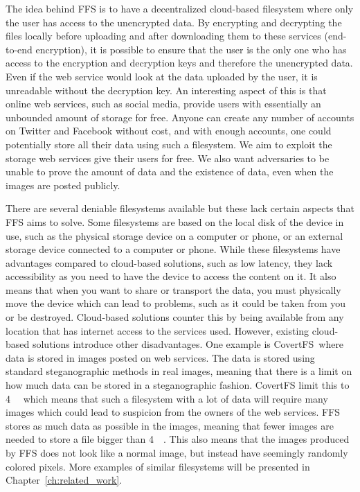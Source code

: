 The idea behind \gls{FFS} is to have a decentralized \mbox{cloud-based} filesystem where only the user has access to the unencrypted data. By encrypting and decrypting the files locally before uploading and after downloading them to these services (\mbox{end-to-end} encryption), it is possible to ensure that the user is the only one who has access to the encryption and decryption keys and therefore the unencrypted data. Even if the web service would look at the data uploaded by the user, it is unreadable without the decryption key. An interesting aspect of this is that online web services, such as social media, provide users with essentially an unbounded amount of storage for free. Anyone can create any number of accounts on Twitter and Facebook without cost, and with enough accounts, one could potentially store all their data using such a filesystem. We aim to exploit the storage web services give their users for free. We also want adversaries to be unable to prove the amount of data and the existence of data, even when the images are posted publicly.

There are several deniable filesystems available but these lack certain aspects that \gls{FFS} aims to solve. Some filesystems are based on the local disk of the device in use, such as the physical storage device on a computer or phone, or an external storage device connected to a computer or phone. While these filesystems have advantages compared to \mbox{cloud-based} solutions, such as low latency, they lack accessibility as you need to have the device to access the content on it. It also means that when you want to share or transport the data, you must physically move the device which can lead to problems, such as it could be taken from you or be destroyed. \mbox{Cloud-based} solutions counter this by being available from any location that has internet access to the services used. However, existing \mbox{cloud-based} solutions introduce other disadvantages. One example is CovertFS\,\cite{baliga2007web} where data is stored in images posted on web services. The data is stored using standard steganographic methods in real images, meaning that there is a limit on how much data can be stored in a steganographic fashion. CovertFS limit this to \SI{4}{\kilo\byte} which means that such a filesystem with a lot of data will require many images which could lead to suspicion from the owners of the web services. \gls{FFS} stores as much data as possible in the images, meaning that fewer images are needed to store a file bigger than \SI{4}{\kilo\byte}. This also means that the images produced by \gls{FFS} does not look like a normal image, but instead have seemingly randomly colored pixels. More examples of similar filesystems will be presented in Chapter~\ref{ch:related_work}. 